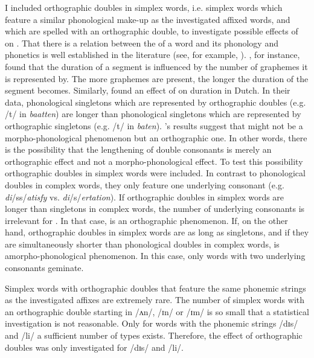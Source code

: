 I included orthographic doubles in simplex words, i.e. simplex words  which feature a similar phonological make-up as the investigated affixed words, and which are spelled with an orthographic double, to investigate possible effects of  on .
That there is a relation between the  of a word and its {phonology and phonetics} is well established in the literature (see, for example, \citealt{Smith.1976,Ehri.1993,Warner.2004,Warner.2006,Brewer.2008,Berg.2016}). 
\cite{Brewer.2008}, for instance, found that the duration of a segment is influenced by the number of graphemes it is represented by. The more graphemes are present, the longer the duration of the segment becomes. Similarly,
\cite{Warner.2004,Warner.2006} found an effect of  on duration in Dutch. In their data, phonological singletons which are represented by orthographic doubles (e.g. /t/ in \textit{baatten}) are longer than phonological singletons which are represented by orthographic singletons (e.g. /t/ in \textit{baten}). \citeauthor{Warner.2004}'s results suggest that  might not be a morpho-phonological phenomenon but an orthographic one. In other words, there is the possibility that the lengthening of double consonants is merely an orthographic effect and not a morpho-phonological effect.
To test this possibility orthographic doubles in simplex words were included.
In contrast to phonological doubles in complex words, they only feature one underlying consonant (e.g. \textit{di}/ss/\textit{atisfy} vs. \textit{di}/s/\textit{ertation}). 
If  orthographic doubles in simplex words are longer than singletons in complex words, the number of underlying consonants is irrelevant for .  In that case,  is an orthographic phenomenon. 
If, on the other hand, orthographic doubles in simplex words are as long as singletons, and if they are simultaneously shorter than  phonological doubles in complex words,  is amorpho-phonological phenomenon. In this case, only words with two underlying consonants {geminate}.



Simplex words with orthographic doubles that feature the same phonemic strings as the investigated affixes are extremely rare. The number of simplex words with an orthographic double starting in /ʌn/, /ɪn/ or /ɪm/ is so small that a statistical investigation is not reasonable. Only for words with the phonemic strings /dɪs/ and /li/ a sufficient number of types exists. Therefore, the effect of orthographic doubles was only investigated for /dɪs/ and /li/. 



